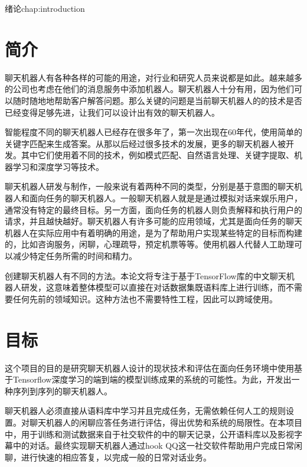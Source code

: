 \begin{cuzchapter}{绪论}{chap:introduction}

\section{简介}\label{sec:background}

聊天机器人有各种各样的可能的用途，对行业和研究人员来说都是如此。越来越多的公司也考虑在他们的消息服务中添加机器人。聊天机器人十分有用，因为他们可以随时随地地帮助客户解答问题。那么关键的问题是当前聊天机器人的的技术是否已经变得足够先进，让我们可以设计出有效的聊天机器人。

智能程度不同的聊天机器人已经存在很多年了，第一次出现在60年代，\cite{Weizenbaum:1966:ECP:365153.365168}使用简单的关键字匹配来生成答案。从那以后经过很多技术的发展，更多的聊天机器人被开发。其中它们使用着不同的技术，例如模式匹配、自然语言处理、关键字提取、机器学习和深度学习等技术。

聊天机器人研发与制作，一般来说有着两种不同的类型，分别是基于意图的聊天机器人和面向任务的聊天机器人。一般聊天机器人就是是通过模拟对话来娱乐用户，通常没有特定的最终目标。另一方面，面向任务的机器人则负责解释和执行用户的请求，并且越快越好。聊天机器人有许多可能的应用领域，尤其是面向任务的聊天机器人在实际应用中有着明确的用途，是为了帮助用户实现某些特定的目标而构建的，比如咨询服务，闲聊，心理疏导，预定机票等等。使用机器人代替人工助理可以减少特定任务所需的时间和精力。

创建聊天机器人有不同的方法。本论文将专注于基于TensorFlow库的中文聊天机器人研发，这意味着整体模型可以直接在对话数据集既语料库上进行训练，而不需要任何先前的领域知识。这种方法也不需要特性工程，因此可以跨域使用。
\section{目标}\label{sec:background}

这个项目的目的是研究聊天机器人设计的现状技术和评估在面向任务环境中使用基于Tensorflow深度学习的端到端的模型训练成果的系统的可能性。为此，开发出一种序列到序列的聊天机器人。

聊天机器人必须直接从语料库中学习并且完成任务，无需依赖任何人工的规则设置。对聊天机器人的闲聊应答任务进行评估，得出优势和系统的局限性。在本项目中，用于训练和测试数据来自于社交软件的中的聊天记录，公开语料库以及影视字幕中的对话。最终实现聊天机器人通过hook QQ这一社交软件帮助用户完成日常闲聊，进行快速的相应答复，以完成一般的日常对话业务。

\end{cuzchapter}